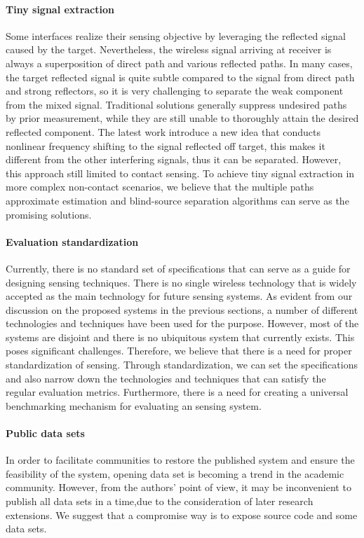 \paragraph*{Tiny signal extraction} Some interfaces realize their sensing objective by leveraging the reflected signal caused by the target. Nevertheless, the wireless signal arriving at receiver is always a superposition of  direct path and various reflected paths. In many cases, the target reflected signal is quite subtle compared to the signal from direct path and strong reflectors, so it is very challenging to separate the weak component from the mixed signal. Traditional solutions generally suppress undesired paths by prior measurement, while they are still unable to thoroughly attain the desired reflected component. The latest work introduce a new idea that conducts nonlinear frequency shifting to the signal reflected off target, this makes it different from the other interfering signals, thus it can be separated. However, this approach still limited to contact sensing. To achieve tiny signal extraction in more complex non-contact scenarios, we believe that the multiple paths approximate estimation and blind-source separation algorithms can serve as the promising solutions.

\paragraph*{Evaluation standardization} Currently, there is no standard set of specifications that can serve as a guide for designing sensing techniques. There is no single wireless technology that is widely accepted as the main technology for future sensing systems. As evident from our discussion on the proposed systems in the previous sections, a number of different technologies and techniques have been used for the purpose. However, most of the systems are disjoint and there is no ubiquitous system that currently exists. This poses significant challenges. Therefore, we believe that there is a need for proper standardization of sensing. Through standardization, we can set the specifications and also narrow down the technologies and techniques that can satisfy the regular evaluation metrics. Furthermore, there is a need for creating a universal benchmarking mechanism for evaluating an sensing system.

\paragraph*{Public data sets} In order to facilitate communities to restore the published system and ensure the feasibility of the system, opening data set is becoming a trend in the academic community. However, from the authors' point of view, it may be inconvenient to publish all data sets in a time,due to the consideration of later research extensions. We suggest that a compromise way is to expose source code and some data sets.
